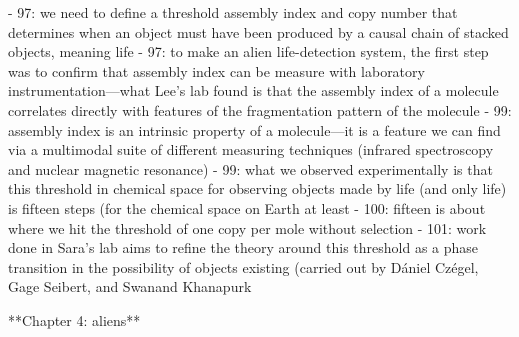 \documentclass[11pt]{article}
\begin{document}
\begin{markdown}
- 97: we need to define a threshold assembly index and copy number that determines when an object must have been produced by a causal chain of stacked objects, meaning life
- 97: to make an alien life-detection system, the first step was to confirm that assembly index can be measure with laboratory instrumentation—what Lee’s lab found is that the assembly index of a molecule correlates directly with features of the fragmentation pattern of the molecule
- 99: assembly index is an intrinsic property of a molecule—it is a feature we can find via a multimodal suite of different measuring techniques (infrared spectroscopy and nuclear magnetic resonance)
- 99: what we observed experimentally is that this threshold in chemical space for observing objects made by life (and only life) is fifteen steps (for the chemical space on Earth at least
- 100: fifteen is about where we hit the threshold of one copy per mole without selection
- 101: work done in Sara’s lab aims to refine the theory around this threshold as a phase transition in the possibility of objects existing (carried out by Dániel Czégel, Gage Seibert, and Swanand Khanapurk

**Chapter 4: aliens**


\end{markdown}
\end{document}
